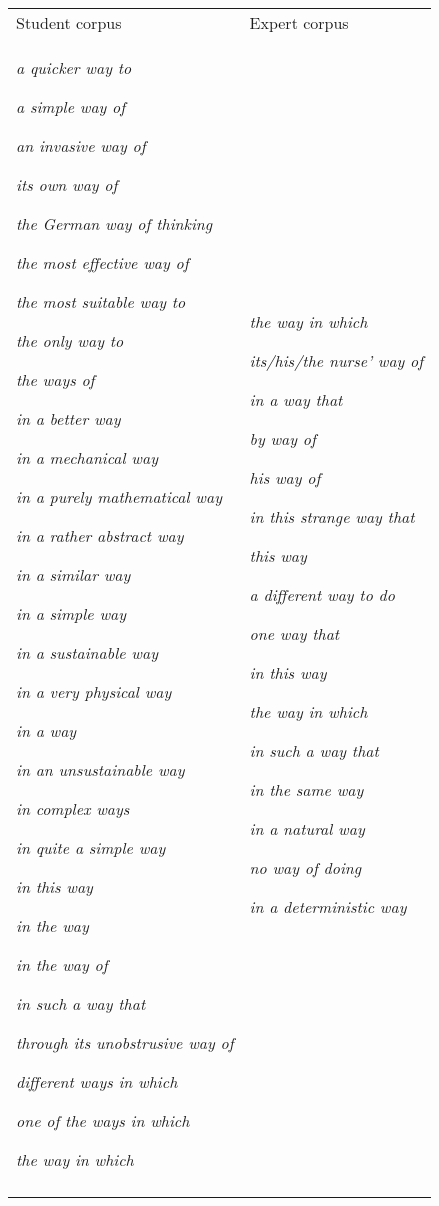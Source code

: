 \begin{tabularx}{\textwidth}{XX}

\lsptoprule

Student corpus & Expert corpus\\
\textit{a quicker way to} 

\textit{a simple way of}

\textit{an invasive way of}

\textit{its own way of}

\textit{the German way of thinking}

\textit{the most effective way of}

\textit{the most suitable way to}

\textit{the only way to}

\textit{the ways of} 

\textit{in a better way} 

\textit{in a mechanical way}

\textit{in a purely mathematical way}

\textit{in a rather abstract way}

\textit{in a similar way}

\textit{in a simple way}

\textit{in a sustainable way}

\textit{in a very physical way}

\textit{in a way}

\textit{in an unsustainable way}

\textit{in complex ways}

\textit{in quite a simple way}

\textit{in this way}

\textit{in the way}

\textit{in the way of}

\textit{in such a way that}

\textit{through its unobstrusive way of}

\textit{different ways in which}

\textit{one of the ways in which}

\textit{the way in which} & \textit{the way in which}

\textit{its/his/the nurse’ way of} 

\textit{in a way that}

\textit{by way of}

\textit{his way of} 

\textit{in this strange way that}

\textit{this way}

\textit{a different way to do}

\textit{one way that}

\textit{in this way}

\textit{the way in which}

\textit{in such a way that}

\textit{in the same way}

\textit{in a natural way}

\textit{no way of doing}

\textit{in a deterministic way}\\
\lspbottomrule
\end{tabularx}
